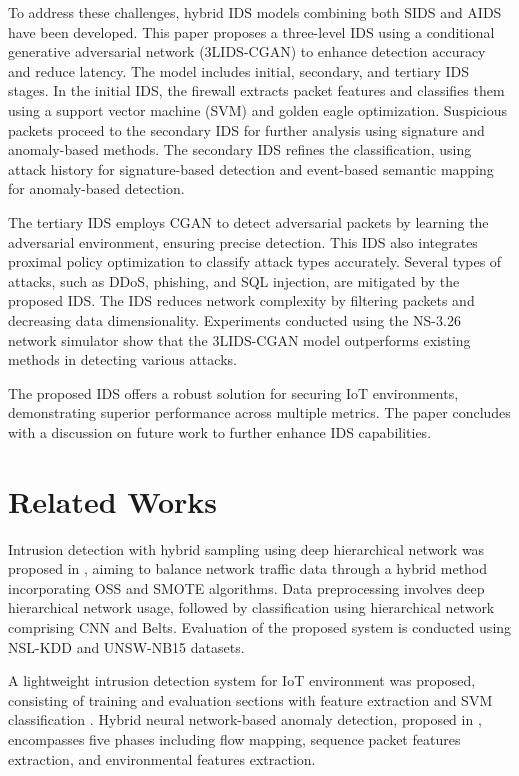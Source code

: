 \documentclass[conference]{IEEEtran}
\begin{document}
To address these challenges, hybrid IDS models combining both SIDS and AIDS have been developed. This paper proposes a three-level IDS using a conditional generative adversarial network (3LIDS-CGAN) to enhance detection accuracy and reduce latency. The model includes initial, secondary, and tertiary IDS stages. In the initial IDS, the firewall extracts packet features and classifies them using a support vector machine (SVM) and golden eagle optimization. Suspicious packets proceed to the secondary IDS for further analysis using signature and anomaly-based methods. The secondary IDS refines the classification, using attack history for signature-based detection and event-based semantic mapping for anomaly-based detection.

The tertiary IDS employs CGAN to detect adversarial packets by learning the adversarial environment, ensuring precise detection. This IDS also integrates proximal policy optimization to classify attack types accurately. Several types of attacks, such as DDoS, phishing, and SQL injection, are mitigated by the proposed IDS. The IDS reduces network complexity by filtering packets and decreasing data dimensionality. Experiments conducted using the NS-3.26 network simulator show that the 3LIDS-CGAN model outperforms existing methods in detecting various attacks.

The proposed IDS offers a robust solution for securing IoT environments, demonstrating superior performance across multiple metrics. The paper concludes with a discussion on future work to further enhance IDS capabilities.


\section{Related Works}
Intrusion detection with hybrid sampling using deep hierarchical network was proposed in \cite{29}, aiming to balance network traffic data through a hybrid method incorporating OSS and SMOTE algorithms. Data preprocessing involves deep hierarchical network usage, followed by classification using hierarchical network comprising CNN and Belts. Evaluation of the proposed system is conducted using NSL-KDD and UNSW-NB15 datasets.  

A lightweight intrusion detection system for IoT environment was proposed, consisting of training and evaluation sections with feature extraction and SVM classification \cite{30}. Hybrid neural network-based anomaly detection, proposed in \cite{31}, encompasses five phases including flow mapping, sequence packet features extraction, and environmental features extraction. 
\end{document}
